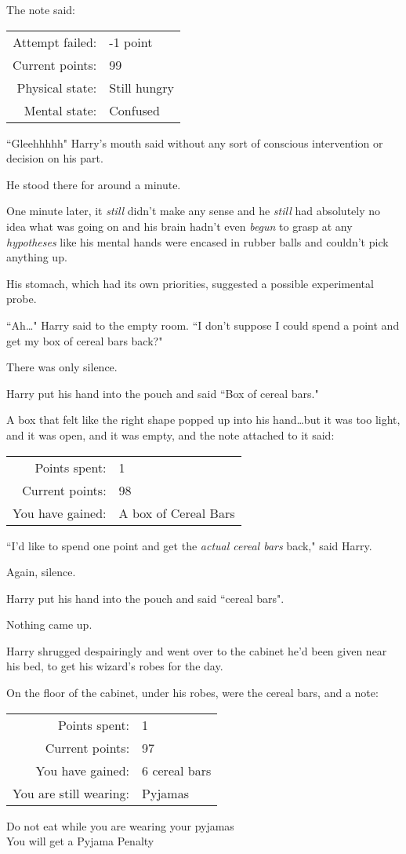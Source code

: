 The note said:
\begin{writtenNote}
\begin{tabular}{rl}
Attempt failed: & -1 point\\
Current points: & 99\\
Physical state: & Still hungry\\
Mental state: & Confused
\end{tabular}
\end{writtenNote}

``Gleehhhhh" Harry's mouth said without any sort of conscious intervention or decision on his part.

He stood there for around a minute.

One minute later, it \emph{still} didn't make any sense and he \emph{still} had absolutely no idea what was going on and his brain hadn't even \emph{begun} to grasp at any \emph{hypotheses} like his mental hands were encased in rubber balls and couldn't pick anything up.

His stomach, which had its own priorities, suggested a possible experimental probe.

``Ah…" Harry said to the empty room. ``I don't suppose I could spend a point and get my box of cereal bars back?"

There was only silence.

Harry put his hand into the pouch and said ``Box of cereal bars."

A box that felt like the right shape popped up into his hand…but it was too light, and it was open, and it was empty, and the note attached to it said:
\begin{writtenNote}
\begin{tabular}{rl}
Points spent: & 1\\
Current points: & 98\\
You have gained: & A box of Cereal Bars
\end{tabular}
\end{writtenNote}

``I'd like to spend one point and get the \emph{actual cereal bars} back," said Harry.

Again, silence.

Harry put his hand into the pouch and said ``cereal bars".

Nothing came up.

Harry shrugged despairingly and went over to the cabinet he'd been given near his bed, to get his wizard's robes for the day.

On the floor of the cabinet, under his robes, were the cereal bars, and a note:
\begin{writtenNote}
\begin{tabular}{rl}
Points spent: & 1\\
Current points: & 97\\
You have gained: & 6 cereal bars\\
You are still wearing: & Pyjamas\\
\end{tabular}

Do not eat while you are wearing your pyjamas\\
You will get a Pyjama Penalty
\end{writtenNote}

